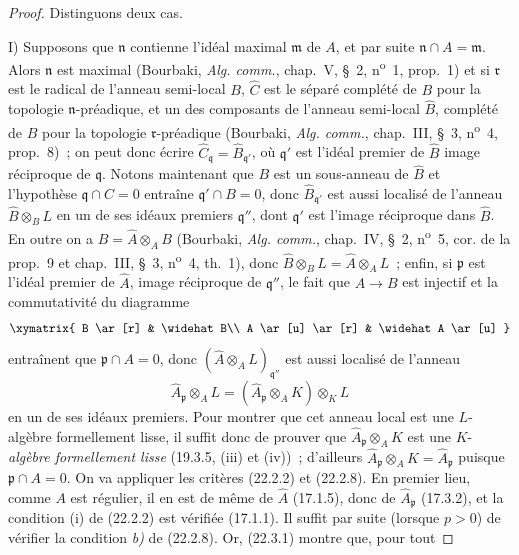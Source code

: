 \begin{proof}
Distinguons deux cas.

I) Supposons que $\mathfrak n$ contienne l'idéal maximal $\mathfrak m$ de
$A$, et par suite $\mathfrak n\cap A=\mathfrak m$. Alors $\mathfrak n$ est
maximal (Bourbaki, \emph{Alg. comm.}, chap.~V, §~2,
n\textsuperscript{o}~1, prop.~1) et si $\mathfrak r$ est le radical de
l'anneau semi-local $B$, $\widehat C$ est le séparé complété de $B$ pour la
topologie $\mathfrak n$-préadique, et un des composants de l'anneau
semi-local $\widehat B$, complété de $B$ pour la topologie
$\mathfrak r$-préadique (Bourbaki, \emph{Alg. comm.}, chap.~III, §~3,
n\textsuperscript{o}~4, prop.~8)~; on peut donc écrire
$\widehat C_\mathfrak q=\widehat B_{\mathfrak q'}$, où $\mathfrak q'$ est
l'idéal premier de $\widehat B$ image réciproque de $\mathfrak q$. Notons
maintenant que $B$ est un sous-anneau de $\widehat B$ et l'hypothèse
$\mathfrak q\cap C=0$ entraîne $\mathfrak q'\cap B=0$, donc
$\widehat B_{\mathfrak q'}$ est aussi localisé de l'anneau
$\widehat B\otimes_B L$ en un de ses idéaux premiers $\mathfrak q''$, dont
$\mathfrak q'$ est l'image réciproque dans $\widehat B$. En outre on a
$\widehat B=\widehat A\otimes_A B$ (Bourbaki, \emph{Alg. comm.}, chap.~IV,
§~2, n\textsuperscript{o}~5, cor. de la prop.~9 et chap.~III, §~3,
n\textsuperscript{o}~4, th.~1), donc
$\widehat B\otimes_B L=\widehat A\otimes_A L$~; enfin, si $\mathfrak p$ est
l'idéal premier de $\widehat A$, image réciproque de $\mathfrak q''$, le
fait que $A\to B$ est injectif et la commutativité du diagramme
\[
  \xymatrix{
    B \ar[r] & \widehat B\\
    A \ar[u] \ar[r] & \widehat A \ar[u]
  }
\]
entraînent que $\mathfrak p\cap A=0$, donc
$(\widehat A\otimes_A L)_{\mathfrak q''}$ est aussi localisé de l'anneau
\[
  \widehat A_\mathfrak p\otimes_A L
  =(\widehat A_\mathfrak p\otimes_A K)\otimes_K L
\]
en un de ses idéaux premiers. Pour montrer que cet anneau local est une $L$-algèbre formellement lisse,
il suffit donc de prouver que $\widehat A_\mathfrak p\otimes_A K$ est une
$K$-\emph{algèbre formellement lisse} (19.3.5, (iii) et (iv))~; d'ailleurs
$\widehat A_\mathfrak p\otimes_A K=\widehat A_\mathfrak p$ puisque
$\mathfrak p\cap A=0$. On va appliquer les critères (22.2.2) et (22.2.8).
En premier lieu, comme $A$ est régulier, il en est de même de $\widehat A$
(17.1.5), donc de $\widehat A_\mathfrak p$ (17.3.2), et la condition (i) de
(22.2.2) est vérifiée (17.1.1). Il suffit par suite (lorsque $p>0$) de
vérifier la condition \emph{b)} de (22.2.8). Or, (22.3.1) montre que, pour tout

\end{proof}
